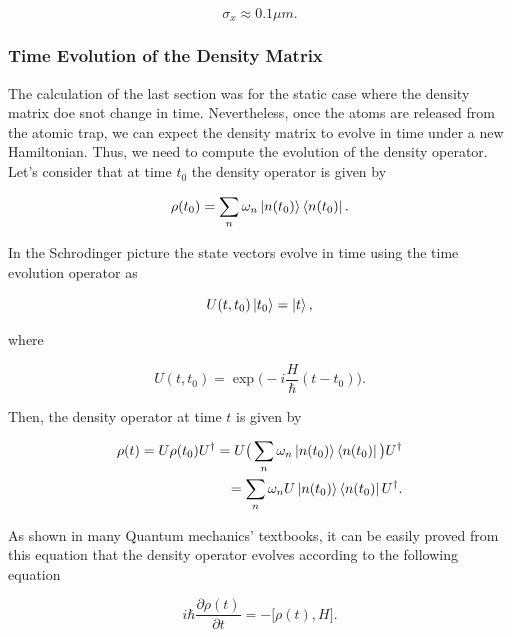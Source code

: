 \documentclass{article}
\begin{document}
\begin{equation}
    \sigma_{x} \approx 0.1 \mu m.
\end{equation}

\subsubsection{Time Evolution of the Density Matrix}
The calculation of the last section was for the static case where the density matrix doe snot change in time. Nevertheless, once the atoms are released from the atomic trap, we can expect the density matrix to evolve in time under a new Hamiltonian. Thus, we need to compute the evolution of the density operator. Let's consider that at time $t_{0}$ the density operator is given by

\begin{equation}
    \rho(t_{0}) = \sum_{n} \omega_{n} \ket{n(t_{0})}\bra{n(t_{0})}.
\end{equation}

In the Schrodinger picture the state vectors evolve in time using the time evolution operator as

\begin{equation}
    U(t, t_{0}) \ket{t_{0}} = \ket{t},
\end{equation}

where

\begin{equation}
    U(t,t_{0}) = \exp \bigg( -i \frac{H}{\hbar} (t-t_{0}) \bigg).
\end{equation}

Then, the density operator at time $t$ is given by

\begin{equation}
    \begin{split}
        \rho(t) = U \rho(t_{0}) U^{\dagger} = U \big( \sum_{n} \omega_{n} \ket{n(t_{0})}\bra{n(t_{0})} \big) U^{\dagger} \\ = \sum_{n} \omega_{n} U \ket{n(t_{0})}\bra{n(t_{0})} U^{\dagger}. 
    \end{split}
\end{equation}

As shown in many Quantum mechanics' textbooks, it can be easily proved from this equation that the density operator evolves according to the following equation

\begin{equation}
    i\hbar \frac{\partial \rho(t)}{\partial t} = - \big[\rho(t), H \big].
\end{equation}
\end{document}
